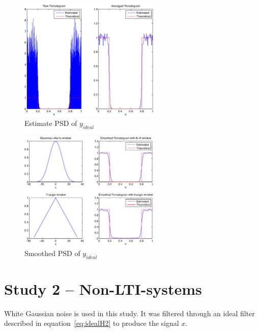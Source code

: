 \documentclass[10pt]{article}
\begin{document}
\begin{figure}[!hp]

    \begin{center}
      \includegraphics[width=0.6\textwidth]{BPeriodogram}
    \caption{Estimate PSD of $y_{ideal}$ \label{fig:BPSDest}}
    \end{center}

\end{figure}

\begin{figure}[!hp]

    \begin{center}
      \includegraphics[width=0.6\textwidth]{BSmoothed}
    \caption{Smoothed PSD of $y_{ideal}$ \label{fig:BPSDSmooth}}
    \end{center}

\end{figure}




\clearpage


\section{Study 2 – Non-LTI-systems}
White Gaussian noise is used in this study. It was filtered through an ideal filter
described in equation~\ref{eq:idealH2} to produce the signal $x$.
\end{document}
